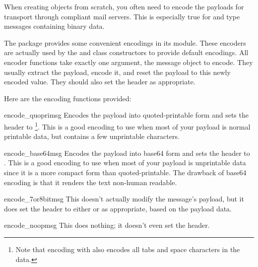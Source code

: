 
When creating  objects from scratch, you often need to
encode the payloads for transport through compliant mail servers.
This is especially true for  and 
type messages containing binary data.

The  package provides some convenient encodings in its
 module.  These encoders are actually used by the
 and  class constructors to provide default
encodings.  All encoder functions take exactly one argument, the
message object to encode.  They usually extract the payload, encode
it, and reset the payload to this newly encoded value.  They should also
set the  header as appropriate.

Here are the encoding functions provided:

\begin{funcdesc}{encode_quopri}{msg}
Encodes the payload into quoted-printable form and sets the
 header to
\footnote{Note that encoding with
 also encodes all tabs and space characters in
the data.}.
This is a good encoding to use when most of your payload is normal
printable data, but contains a few unprintable characters.
\end{funcdesc}

\begin{funcdesc}{encode_base64}{msg}
Encodes the payload into base64 form and sets the
 header to
.  This is a good encoding to use when most of your payload
is unprintable data since it is a more compact form than
quoted-printable.  The drawback of base64 encoding is that it
renders the text non-human readable.
\end{funcdesc}

\begin{funcdesc}{encode_7or8bit}{msg}
This doesn't actually modify the message's payload, but it does set
the  header to either  or
 as appropriate, based on the payload data.
\end{funcdesc}

\begin{funcdesc}{encode_noop}{msg}
This does nothing; it doesn't even set the
 header.
\end{funcdesc}
